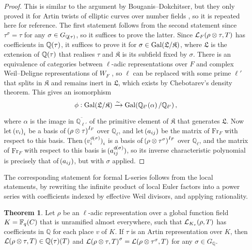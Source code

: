 \documentclass{article}
\theoremstyle{definition}
\newtheorem{theorem}[n]{Theorem}
\theoremstyle{definition}
\newcommand{\FF}{\mathbb{F}}
\newcommand{\Fr}{\mathrm{Fr}}
\newcommand{\Gal}{\mathrm{Gal}}
\newcommand{\KKKK}{\mathfrak{K}}
\newcommand{\LLL}{\mathcal{L}}
\newcommand{\LLLL}{\mathfrak{L}}
\newcommand{\QQ}{\mathbb{Q}}
\newcommand{\br}{\!\del[0]}
\begin{document}
\begin{proof}
This is similar to the argument by Bouganis--Dokchitser, but they only proved it for Artin twists of elliptic curves over number fields \cite[Lemma 4.4]{BD07}, so it is repeated here for reference. The first statement follows from the second statement since $ \tau^\sigma = \tau $ for any $ \sigma \in G_{\QQ\br{\tau}} $, so it suffices to prove the latter. Since $ \LLL_F\br{\rho \otimes \tau, T} $ has coefficients in $ \QQ\br{\tau} $, it suffices to prove it for $ \sigma \in \Gal\br{\LLLL / \KKKK} $, where $ \LLLL $ is the extension of $ \QQ\br{\tau} $ that realises $ \tau $ and $ \KKKK $ is its subfield fixed by $ \sigma $. There is an equivalence of categories between $ \ell $-adic representations over $ F $ and complex Weil--Deligne representations of $ W_F $ \cite[Section 8]{Del73}, so $ \ell $ can be replaced with some prime $ \ell' $ that splits in $ \KKKK $ and remains inert in $ \LLLL $, which exists by Chebotarev's density theorem. This gives an isomorphism
$$ \phi : \Gal\br{\LLLL / \KKKK} \xrightarrow{\sim} \Gal\br{\QQ_{\ell'}\br{\alpha} / \QQ_{\ell'}}, $$

\pagebreak

\noindent where $ \alpha $ is the image in $ \overline{\QQ_{\ell'}} $ of the primitive element of $ \KKKK $ that generates $ \LLLL $. Now let $ \br{v_i}_i $ be a basis of $ \br{\rho \otimes \tau}^{I_F} $ over $ \QQ_\ell $, and let $ \br{a_{ij}} $ be the matrix of $ \Fr_F $ with respect to this basis. Then $ \br{v_i^{\phi\br{\sigma}}}_i $ is a basis of $ \br{\rho \otimes \tau^\sigma}^{I_F} $ over $ \QQ_\ell $, and the matrix of $ \Fr_F $ with respect to this basis is $ \br{a_{ij}^{\phi\br{\sigma}}} $, so its inverse characteristic polynomial is precisely that of $ \br{a_{ij}} $, but with $ \sigma $ applied.
\end{proof}

The corresponding statement for formal L-series follows from the local statements, by rewriting the infinite product of local Euler factors into a power series with coefficients indexed by effective Weil divisors, and applying rationality.

\begin{theorem}
\label{thm:global}
Let $ \rho $ be an $ \ell $-adic representation over a global function field $ K = \FF_q\br{C} $ that is unramified almost everywhere, such that $ \LLL_{K_v}\br{\rho, T} $ has coefficients in $ \QQ $ for each place $ v $ of $ K $. If $ \tau $ is an Artin representation over $ K $, then $ \LLL\br{\rho \otimes \tau, T} \in \QQ\br{\tau}\br{T} $ and $ \LLL\br{\rho \otimes \tau, T}^\sigma = \LLL\br{\rho \otimes \tau^\sigma, T} $ for any $ \sigma \in G_\QQ $.
\end{theorem}
\end{document}
